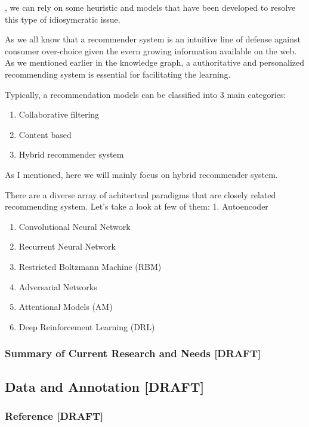 \documentclass{acm_proc_article-sp}
\begin{document}
, we can rely on some heuristic and models that have been developed to
resolve this type of idiosymcratic issue.

As we all know that a recommender system is an intuitive line of defense
against consumer over-choice given the evern growing information
available on the web. As we mentioned earlier in the knowledge graph, a
authoritative and personalized recommending system is essential for
facilitating the learning.

Typically, a recommendation models can be classified into 3 main
categories:

\begin{enumerate}
\def\labelenumi{\arabic{enumi}.}
\item
  Collaborative filtering
\item
  Content based
\item
  Hybrid recommender system
\end{enumerate}

As I mentioned, here we will mainly focus on hybrid recommender system.

There are a diverse array of achitectual paradigms that are closely
related recommending system. Let's take a look at few of them: 1.
Autoencoder

\begin{enumerate}
\def\labelenumi{\arabic{enumi}.}
\setcounter{enumi}{1}
\item
  Convolutional Neural Network
\item
  Recurrent Neural Network
\item
  Restricted Boltzmann Machine (RBM)
\item
  Adversarial Networks
\item
  Attentional Models (AM)
\item
  Deep Reinforcement Learning (DRL)
\end{enumerate}

\subsubsection{Summary of Current Research and Needs
{[}DRAFT{]}}\label{summary-of-current-research-and-needs-draft}

\subsection{Data and Annotation
{[}DRAFT{]}}\label{data-and-annotation-draft}

\subsubsection{Reference {[}DRAFT{]}}\label{reference-draft}
\end{document}
